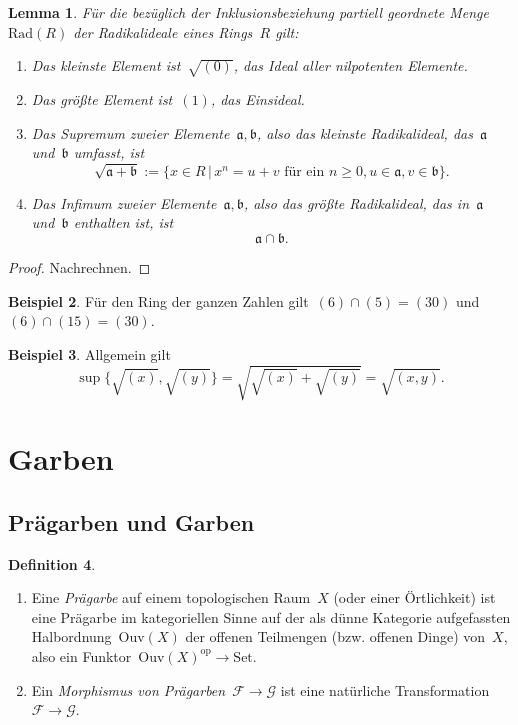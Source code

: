 \documentclass[a4paper,ngerman,12pt]{scrartcl}
\theoremstyle{definition}
\newtheorem{defn}{Definition}[section]
\newtheorem{bsp}[defn]{Beispiel}
\theoremstyle{plain}
\newtheorem{lemma}[defn]{Lemma}
\theoremstyle{remark}
\renewcommand{\aa}{\mathfrak{a}}
\newcommand{\bb}{\mathfrak{b}}
\newcommand{\F}{\mathcal{F}}
\newcommand{\G}{\mathcal{G}}
\newcommand{\Ouv}{\mathrm{Ouv}}
\newcommand{\Rad}{\mathrm{Rad}}
\newcommand{\op}{\mathrm{op}}
\newcommand{\Set}{\mathrm{Set}}
\renewcommand{\_}{\mathpunct{.}\,}
\newcommand{\?}{\,{:}\,}
\begin{document}
\begin{lemma}\label{lemma:rad}%
Für die bezüglich der Inklusionsbeziehung partiell geordnete Menge~$\Rad(R)$
der Radikalideale eines Rings~$R$ gilt:
\begin{enumerate}
\item Das kleinste Element ist~$\sqrt{(0)}$, das Ideal aller nilpotenten
Elemente.
\item Das größte Element ist~$(1)$, das Einsideal.
\item Das Supremum zweier Elemente~$\aa,\bb$, also das kleinste Radikalideal,
das~$\aa$ und~$\bb$ umfasst, ist
\[ \sqrt{\aa + \bb} := \{ x \in R \,|\, \text{$x^n = u + v$ für ein~$n \geq 0,
u \in \aa, v \in \bb$} \}. \]
\item Das Infimum zweier Elemente~$\aa,\bb$, also das größte Radikalideal,
das in~$\aa$ und~$\bb$ enthalten ist, ist
\[ \aa \cap \bb. \]
\end{enumerate}
\end{lemma}
\begin{proof}Nachrechnen.\end{proof}

\begin{bsp}Für den Ring der ganzen Zahlen gilt~$(6) \cap (5) = (30)$ und~$(6)
\cap (15) = (30)$.\end{bsp}

\begin{bsp}Allgemein gilt
\[ \sup\bigl\{ \sqrt{(x)}, \sqrt{(y)} \bigr\} = \sqrt{\sqrt{(x)} + \sqrt{(y)}} =
\sqrt{(x,y)}. \]
\end{bsp}


\section{Garben}

\label{appendix:garben}

\subsection{Prägarben und Garben}

\begin{defn}\begin{enumerate}
\item Eine \emph{Prägarbe} auf einem topologischen Raum~$X$ (oder einer
Örtlichkeit) ist eine Prägarbe im kategoriellen Sinne auf der
als dünne Kategorie aufgefassten Halb\-ord\-nung~$\Ouv(X)$ der offenen
Teilmengen (bzw.  offenen Dinge) von~$X$, also ein Funktor~$\Ouv(X)^\op \to
\Set$.
\item Ein \emph{Morphismus von Prägarben}~$\F \to \G$ ist eine natürliche
Transformation~$\F \to \G$.
\end{enumerate}
\end{defn}
\end{document}
